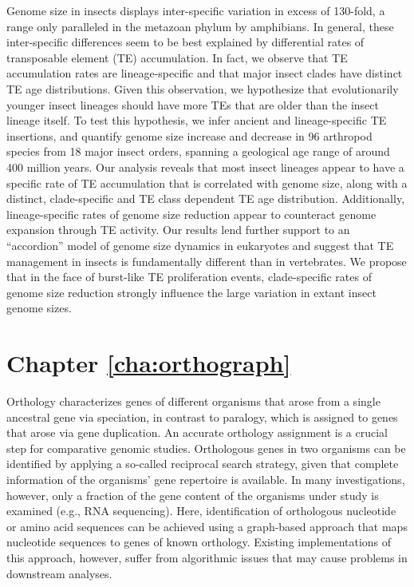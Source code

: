Genome size in insects displays inter-specific variation in excess of
130-fold, a range only paralleled in the metazoan phylum by amphibians. 
In general, these inter-specific differences seem to be best explained
by differential rates of transposable element (TE) accumulation. In
fact, we observe that TE accumulation rates are lineage-specific and
that major insect clades have distinct TE age distributions. Given this
observation, we hypothesize that evolutionarily younger insect lineages
should have more TEs that are older than the insect lineage itself. To
test this hypothesis, we infer ancient and lineage-specific TE
insertions, and quantify genome size increase and decrease in 96
arthropod species from 18 major insect orders, spanning a geological age
range of around 400 million years. Our analysis reveals that most
insect lineages appear to have a specific rate of TE accumulation that
is correlated with genome size, along with a distinct, clade-specific
and TE class dependent TE age distribution. Additionally,
lineage-specific rates of genome size reduction appear to counteract
genome expansion through TE activity. Our results lend further support
to an ``accordion'' model of genome size dynamics in eukaryotes and
suggest that TE management in insects is fundamentally different than in
vertebrates. We propose that in the face of burst-like TE proliferation
events, clade-specific rates of genome size reduction strongly influence
the large variation in extant insect genome sizes.%

\section*{Chapter \ref{cha:orthograph}}

Orthology characterizes genes of different organisms that arose from a
single ancestral gene via speciation, in contrast to paralogy, which is
assigned to genes that arose via gene duplication. An accurate orthology
assignment is a crucial step for comparative genomic studies.
Orthologous genes in two organisms can be identified by applying a
so-called reciprocal search strategy, given that complete information of
the organisms' gene repertoire is available. In many investigations,
however, only a fraction of the gene content of the organisms under
study is examined (e.g., RNA sequencing).  Here, identification of
orthologous nucleotide or amino acid sequences can be achieved using a
graph-based approach that maps nucleotide sequences to genes of known
orthology. Existing implementations of this approach, however, suffer
from algorithmic issues that may cause problems in downstream analyses.

